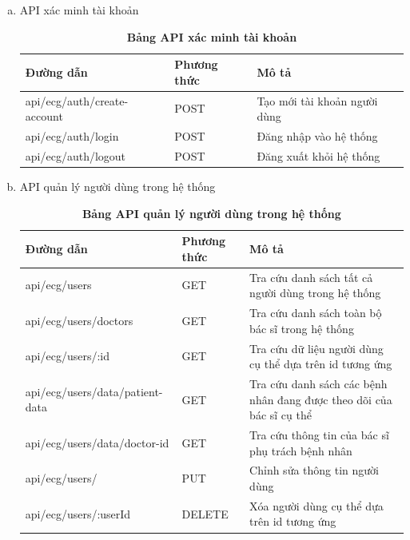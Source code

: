	\begin{enumerate}[a)]
		\item API xác minh tài khoản
	
		\begin{xltabular}{\textwidth}{
		  | >{\raggedright\arraybackslash}m{4.6cm}
		  | >{\centering\arraybackslash}m{2.8cm}
		  | >{\raggedright\arraybackslash}X |
		  }
		  \caption{\bfseries \fontsize{12pt}{0pt}\selectfont Bảng API xác minh tài khoản}
		  \label{table_api_auth}
		  \\
		  \hline
		  \bfseries Đường dẫn    &\bfseries Phương thức    &\bfseries Mô tả\\ \hline
		  api/ecg/auth/create-account   &   POST  & Tạo mới tài khoản người dùng \\ \hline
		  api/ecg/auth/login   &    POST    & Đăng nhập vào hệ thống \\ \hline
		  api/ecg/auth/logout   &    POST    & Đăng xuất khỏi hệ thống \\ \hline
		\end{xltabular}
	  
		\item API quản lý người dùng trong hệ thống
		\begin{xltabular}{\textwidth}{
		  | >{\raggedright\arraybackslash}m{4.6cm}
		  | >{\centering\arraybackslash}m{2.8cm}
		  | >{\raggedright\arraybackslash}X |
		  }
		  \caption{\bfseries \fontsize{12pt}{0pt}\selectfont Bảng API quản lý người dùng trong hệ thống}
		  \label{table_api_user}
		  \\
		  \hline
		  \bfseries Đường dẫn    &\bfseries Phương thức    &\bfseries Mô tả\\ \hline
		  api/ecg/users   &   GET  &  Tra cứu danh sách tất cả người dùng trong hệ thống\\  \hline
		  api/ecg/users/doctors   &   GET  &  Tra cứu danh sách toàn bộ bác sĩ trong hệ thống \\  \hline
		  api/ecg/users/:id   &   GET  &  Tra cứu dữ liệu người dùng cụ thể dựa trên id tương ứng \\  \hline
		  api/ecg/users/data/patient-data   &   GET  &  Tra cứu danh sách các bệnh nhân đang được theo dõi của bác sĩ cụ thể \\  \hline
		  api/ecg/users/data/doctor-id   &   GET  &  Tra cứu thông tin của bác sĩ phụ trách bệnh nhân \\  \hline
		  api/ecg/users/   &   PUT  &  Chỉnh sửa thông tin người dùng \\  \hline
		  api/ecg/users/:userId  &   DELETE  &  Xóa người dùng cụ thể dựa trên id tương ứng \\  \hline
		\end{xltabular}
	  

\end{enumerate}
